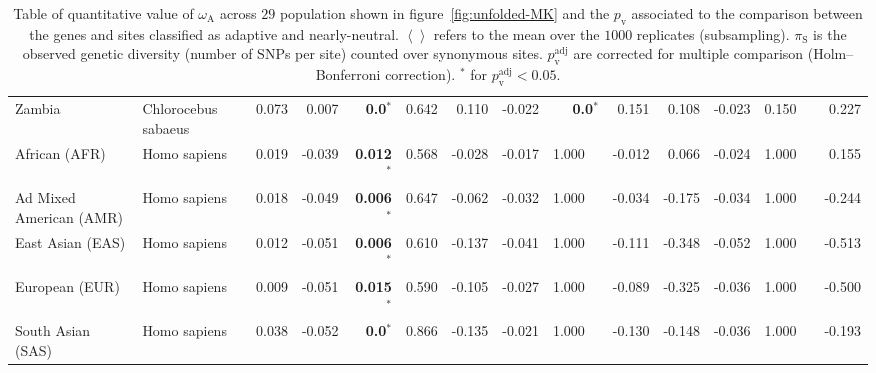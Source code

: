 \documentclass{article}
\begin{document}
\begin{table*}[!ht]
\begin{adjustbox}{width = 1\textwidth}
\begin{tabular}{||l|l||r|r|r|r||r|r|r|r||r|r|r|r||}
                \rowcolor{LIGHTGREY} Zambia                         & Chlorocebus sabaeus & 0.073 & 0.007   & \textbf{0.0}$\bm{^*}$   & 0.642 & 0.110 & -0.022 & \textbf{0.0}$\bm{^*}$      & 0.151 & 0.108 & -0.023  & 0.150~~        & 0.227 \\
                African (AFR)                                       & Homo sapiens        & 0.019 & -0.039  & \textbf{0.012}$\bm{^*}$ & 0.568 & -0.028 & -0.017 & 1.000~~      & -0.012 & 0.066 & -0.024  & 1.000~~        & 0.155 \\
                Ad Mixed American (AMR)                             & Homo sapiens        & 0.018 & -0.049  & \textbf{0.006}$\bm{^*}$ & 0.647 & -0.062 & -0.032 & 1.000~~      & -0.034 & -0.175 & -0.034  & 1.000~~        & -0.244 \\
                East Asian (EAS)                                    & Homo sapiens        & 0.012 & -0.051  & \textbf{0.006}$\bm{^*}$ & 0.610 & -0.137 & -0.041 & 1.000~~      & -0.111 & -0.348 & -0.052  & 1.000~~        & -0.513 \\
                European (EUR)                                      & Homo sapiens        & 0.009 & -0.051  & \textbf{0.015}$\bm{^*}$ & 0.590 & -0.105 & -0.027 & 1.000~~      & -0.089 & -0.325 & -0.036  & 1.000~~        & -0.500 \\
                South Asian (SAS)                                   & Homo sapiens        & 0.038 & -0.052  & \textbf{0.0}$\bm{^*}$   & 0.866 & -0.135 & -0.021 & 1.000~~      & -0.130 & -0.148 & -0.036  & 1.000~~        & -0.193 \\
                \bottomrule
            \end{tabular}
        \end{adjustbox}
        \caption{
            Table of quantitative value of $\omega_{\mathrm{A}}$ across $29$ population shown in figure~\ref{fig:unfolded-MK} and the $p_{\mathrm{v}}$ associated to the comparison between the genes and sites classified as adaptive and nearly-neutral.
            $\left< \right>$ refers to the mean over the $1000$ replicates (subsampling).
            $\pi_{\textrm{S}}$ is the observed genetic diversity (number of SNPs per site) counted over synonymous sites.
            $p_{\mathrm{v}}^{\mathrm{adj}}$ are corrected for multiple comparison (Holm–Bonferroni correction).
            $^*$ for $p_{\mathrm{v}}^{\mathrm{adj}} < 0.05$.
        }
        \label{table:unfolded-MK}
    \end{table*}
\end{document}
